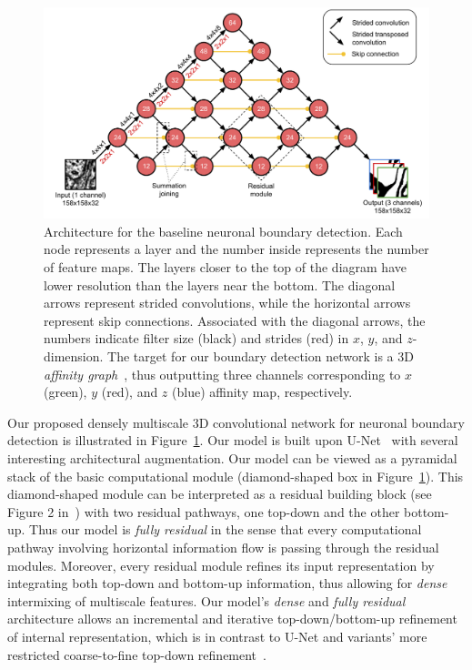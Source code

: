 \documentclass{article}
\begin{document}
\begin{figure}[!b]
\centering
\includegraphics[width=1.0\linewidth]{baseline.pdf}

\caption{Architecture for the baseline neuronal boundary detection. Each node
represents a layer and the number inside represents the number of feature maps.
The layers closer to the top of the diagram have lower resolution than the
layers near the bottom. The diagonal arrows represent strided convolutions,
while the horizontal arrows represent skip connections. Associated with the
diagonal arrows, the numbers indicate filter size (black) and strides (red) in
$x$, $y$, and $z$-dimension. The target for our boundary detection network is a
3D \emph{affinity graph}~\cite{boundary_detection,kisuk,funke2017deep}, thus
outputting three channels corresponding to $x$ (green), $y$ (red), and $z$
(blue) affinity map, respectively.}

\label{fig:boundary_detector}
\end{figure}

Our proposed densely multiscale 3D convolutional network for neuronal boundary
detection is illustrated in Figure~\ref{fig:boundary_detector}. Our model is
built upon U-Net~\cite{unet} with several interesting architectural
augmentation. Our model can be viewed as a pyramidal stack of the basic
computational module (diamond-shaped box in Figure~\ref{fig:boundary_detector}).
This diamond-shaped module can be interpreted as a residual building block (see
Figure 2 in~\cite{resnet}) with two residual pathways, one top-down and the
other bottom-up. Thus our model is \emph{fully residual} in the sense that every
computational pathway involving horizontal information flow is passing through
the residual modules. Moreover, every residual module refines its input
representation by integrating both top-down and bottom-up information, thus
allowing for \emph{dense} intermixing of multiscale features. Our model's
\emph{dense} and \emph{fully residual} architecture allows an incremental and
iterative top-down/bottom-up refinement of internal representation, which is in
contrast to U-Net and variants' more restricted coarse-to-fine top-down
refinement~\cite{unet,pinheiro2016refine,lin2016pyramid}.
\end{document}
